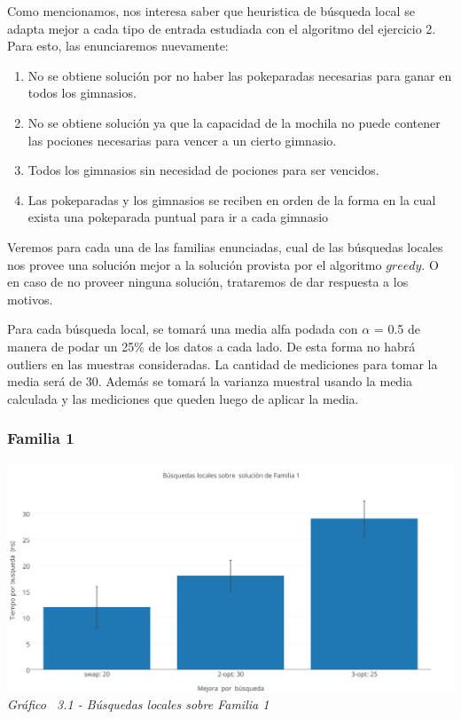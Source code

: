 Como mencionamos, nos interesa saber que heuristica de búsqueda local se adapta mejor a cada tipo de entrada estudiada con el algoritmo del ejercicio 2. Para esto, las enunciaremos nuevamente:

\begin{enumerate}
\item No se obtiene soluci\'on por no haber las pokeparadas necesarias para ganar en todos los gimnasios.
\item No se obtiene soluci\'on ya que la capacidad de la mochila no puede contener las pociones necesarias para vencer a un cierto gimnasio.
\item Todos los gimnasios sin necesidad de pociones para ser vencidos.
\item Las pokeparadas y los gimnasios se reciben en orden de la forma en la cual exista una pokeparada puntual para ir a cada gimnasio
\end{enumerate}

Veremos para cada una de las familias enunciadas, cual de las búsquedas locales nos provee una solución mejor a la solución provista por el algoritmo $greedy$. O en caso de no proveer ninguna solución, trataremos de dar respuesta a los motivos.

Para cada búsqueda local, se tomará una media alfa podada con $\alpha$ = 0.5 de manera de podar un 25\% de los datos a cada lado. De esta forma no habrá outliers en las muestras consideradas. 
La cantidad de mediciones para tomar la media será de 30. Además se tomará la varianza muestral usando la media calculada y las mediciones que queden luego de aplicar la media.\\

\subsubsection*{Familia 1}

\vspace*{0.3cm} \vspace*{0.3cm}
  \begin{center}
 \includegraphics[scale=0.5]{./EJ3/local_search_familia.png}
 {            \textit{Gráfico \ 3.1 - Búsquedas locales sobre Familia 1}}
  \end{center}
  \vspace*{0.3cm}

